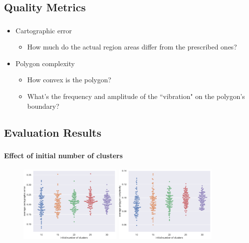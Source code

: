 \documentclass[t,18pt]{beamer}
\begin{document}
\subsection{Quality Metrics}
\label{subsect:quality-metrics}

\begin{frame}
  \frametitle{}
  \begin{itemize}
    \item Cartographic error \begin{itemize}
      \item How much do the actual region areas differ from the prescribed ones?
    \end{itemize}
    \item Polygon complexity \begin{itemize}
      \item How convex is the polygon?
      \item What's the frequency and amplitude of the ``vibration" on the polygon's boundary?
    \end{itemize}
  \end{itemize}
\end{frame}

\subsection{Evaluation Results}
\label{subsect:evaluation-results}

\begin{frame}[c]
  \frametitle{}
  \framesubtitle{Effect of initial number of clusters}
  \begin{figure}
    \includegraphics[width=5cm]{../Thesis/Resources/Evaluation-AverageCartographicError-n.pdf}
    \quad
    \includegraphics[width=5cm]{../Thesis/Resources/Evaluation-AveragePolygonComplexity-n.pdf}
  \end{figure}
\end{frame}
\end{document}

